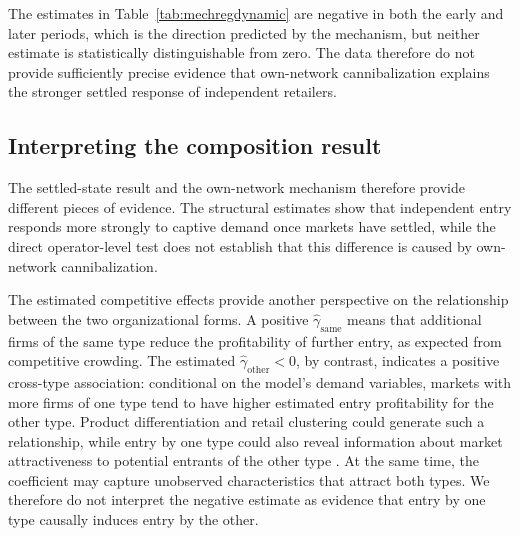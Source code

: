 \documentclass[english,12pt]{article}
\begin{document}
The estimates in Table~\ref{tab:mechregdynamic} are negative in both the early and later periods, which is the direction predicted by the mechanism, but neither estimate is statistically distinguishable from zero. The data therefore do not provide sufficiently precise evidence that own-network cannibalization explains the stronger settled response of independent retailers. 

\begin{table}[htbp]
\centering
\footnotesize

\caption{Own-network overlap and the chain entry response to captive demand. The interaction $\varphi$ measures whether the response of chain entry to captive demand varies with the operator's existing network, separately for early and later market periods. Estimates use Poisson pseudo-maximum likelihood with operator and quarter fixed effects. Standard errors are clustered by operator.}
\label{tab:mechregdynamic}
\end{table}
\newpage
\subsection{Interpreting the composition result}
\label{sec:mechanism-conclusion}

The settled-state result and the own-network mechanism therefore provide different pieces of evidence. The structural estimates show that independent entry responds more strongly to captive demand once markets have settled, while the direct operator-level test does not establish that this difference is caused by own-network cannibalization. 

The estimated competitive effects provide another perspective on the relationship between the two organizational forms. A positive $\hat\gamma_{\text{same}}$ means that additional firms of the same type reduce the profitability of further entry, as expected from competitive crowding. The estimated $\hat\gamma_{\text{other}}<0$, by contrast, indicates a positive cross-type association: conditional on the model's demand variables, markets with more firms of one type tend to have higher estimated entry profitability for the other type. Product differentiation and retail clustering could generate such a relationship, while entry by one type could also reveal information about market attractiveness to potential entrants of the other type \citep{CaplinLeahy1998,ToivanenWaterson2005}. At the same time, the coefficient may capture unobserved characteristics that attract both types. We therefore do not interpret the negative estimate as evidence that entry by one type causally induces entry by the other.
\end{document}
